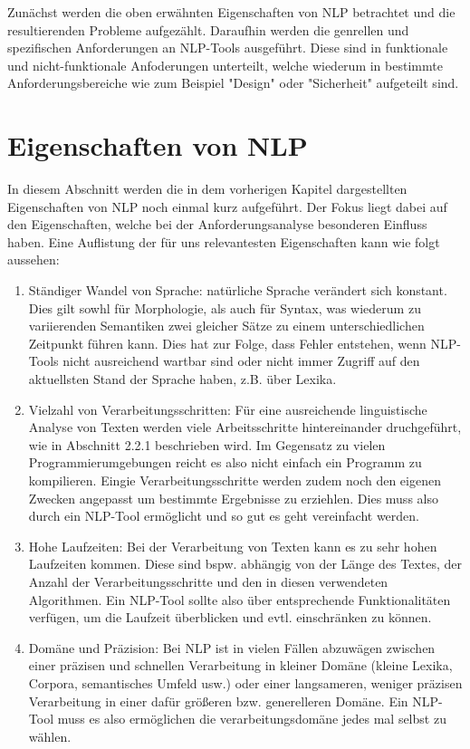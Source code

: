 \documentclass[12pt]{report}
\begin{document}
Zunächst werden die oben erwähnten Eigenschaften von NLP betrachtet und die resultierenden Probleme aufgezählt. Daraufhin werden die genrellen und spezifischen Anforderungen an NLP-Tools ausgeführt. Diese sind in funktionale und nicht-funktionale Anfoderungen unterteilt, welche wiederum in bestimmte Anforderungsbereiche wie zum Beispiel "Design" oder "Sicherheit" aufgeteilt sind.

\section{Eigenschaften von NLP}
In diesem Abschnitt werden die in dem vorherigen Kapitel dargestellten Eigenschaften von NLP noch einmal kurz aufgeführt. Der Fokus liegt dabei auf den Eigenschaften, welche bei der Anforderungsanalyse besonderen Einfluss haben. Eine Auflistung der für uns relevantesten Eigenschaften kann wie folgt aussehen:

\begin{enumerate}
\item Ständiger Wandel von Sprache: natürliche Sprache verändert sich konstant. Dies gilt sowhl für Morphologie, als auch für Syntax, was wiederum zu variierenden Semantiken zwei gleicher Sätze zu einem unterschiedlichen Zeitpunkt führen kann. Dies hat zur Folge, dass Fehler entstehen, wenn NLP-Tools nicht ausreichend wartbar sind oder nicht immer Zugriff auf den aktuellsten Stand der Sprache haben, z.B. über Lexika.
\item Vielzahl von Verarbeitungsschritten: Für eine ausreichende linguistische Analyse von Texten werden viele Arbeitsschritte hintereinander druchgeführt, wie in Abschnitt 2.2.1 beschrieben wird. Im Gegensatz zu vielen Programmierumgebungen reicht es also nicht einfach ein Programm zu kompilieren. Eingie Verarbeitungsschritte werden zudem noch den eigenen Zwecken angepasst um bestimmte Ergebnisse zu erziehlen. Dies muss also durch ein NLP-Tool ermöglicht und so gut es geht vereinfacht werden.
\item Hohe Laufzeiten: Bei der Verarbeitung von Texten kann es zu sehr hohen Laufzeiten kommen. Diese sind bspw. abhängig von der Länge des Textes, der Anzahl der Verarbeitungsschritte und den in diesen verwendeten Algorithmen. Ein NLP-Tool sollte also über entsprechende Funktionalitäten verfügen, um die Laufzeit überblicken und evtl. einschränken zu können. 
\item Domäne und Präzision: Bei NLP ist in vielen Fällen abzuwägen zwischen einer präzisen und schnellen Verarbeitung in kleiner Domäne (kleine Lexika, Corpora, semantisches Umfeld usw.) oder einer langsameren, weniger präzisen Verarbeitung in einer dafür größeren bzw. generelleren Domäne. Ein NLP-Tool muss es also ermöglichen die verarbeitungsdomäne jedes mal selbst zu wählen.
\end{enumerate}
\end{document}
